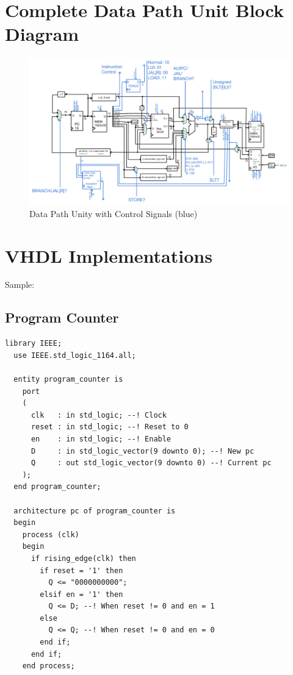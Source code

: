 \documentclass[lettersize,journal]{IEEEtran}
\begin{document}
{\appendices
\section*{Complete Data Path Unit Block Diagram}
\begin{figure}[!h]
  \label{fig:dpu}
  \centering
  \includegraphics[width=16cm, angle=270]{DPU.jpg}
  \caption{Data Path Unity with Control Signals (blue)}
\end{figure}

\section*{VHDL Implementations}
Sample:
\color{red}{TBD due to current overfull issues...}\color{black}\\
\subsection{Program Counter}
\begin{Verbatim}[breaklines]
  library IEEE;
  use IEEE.std_logic_1164.all;
  
  entity program_counter is
    port
    (
      clk   : in std_logic; --! Clock
      reset : in std_logic; --! Reset to 0
      en    : in std_logic; --! Enable
      D     : in std_logic_vector(9 downto 0); --! New pc
      Q     : out std_logic_vector(9 downto 0) --! Current pc
    );
  end program_counter;
  
  architecture pc of program_counter is
  begin
    process (clk)
    begin
      if rising_edge(clk) then
        if reset = '1' then
          Q <= "0000000000";
        elsif en = '1' then
          Q <= D; --! When reset != 0 and en = 1
        else
          Q <= Q; --! When reset != 0 and en = 0
        end if;
      end if;
    end process;
  

\end{Verbatim}}
\end{document}
